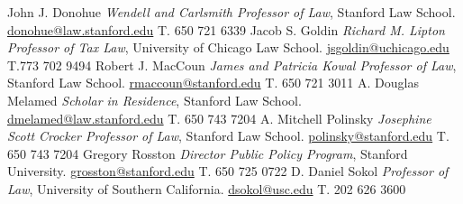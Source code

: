 



\begin{cvskills}

  \cvskill
    {John J. Donohue} %
    {\textit{Wendell and Carlsmith Professor of Law}, Stanford Law School. \href{mailto:donohue@law.stanford.edu}{donohue@law.stanford.edu} T. 650 721 6339} %
  \cvskill
    {Jacob S. Goldin} %
    {\textit{Richard M. Lipton Professor of Tax Law}, University of Chicago Law School. \href{mailto:jsgoldin@uchicago.edu}{jsgoldin@uchicago.edu} T.773 702 9494} %
  \cvskill
    {Robert J. MacCoun} %
    {\textit{James and Patricia Kowal Professor of Law}, Stanford Law School. 
    \href{mailto:rmaccoun@stanford.edu}{rmaccoun@stanford.edu} T. 650 721 3011} %
  \cvskill
    {A. Douglas Melamed} %
    {\textit{Scholar in Residence}, Stanford Law School. 
    \href{mailto:dmelamed@law.stanford.edu}{dmelamed@law.stanford.edu} T. 650 743 7204} %
  \cvskill
    {A. Mitchell Polinsky} %
    {\textit{Josephine Scott Crocker Professor of Law}, Stanford Law School. 
   \href{mailto:polinsky@stanford.edu}{polinsky@stanford.edu} T. 650 743 7204} %
  \cvskill
    {Gregory Rosston} %
    {\textit{Director Public Policy Program}, Stanford University. 
   \href{mailto:grosston@stanford.edu}{grosston@stanford.edu} T. 650 725 0722} %
  \cvskill
    {D. Daniel Sokol} %
    {\textit{Professor of Law}, University of Southern California. 
   \href{mailto:dsokol@usc.edu }{dsokol@usc.edu} T. 202 626 3600} %

\end{cvskills}
